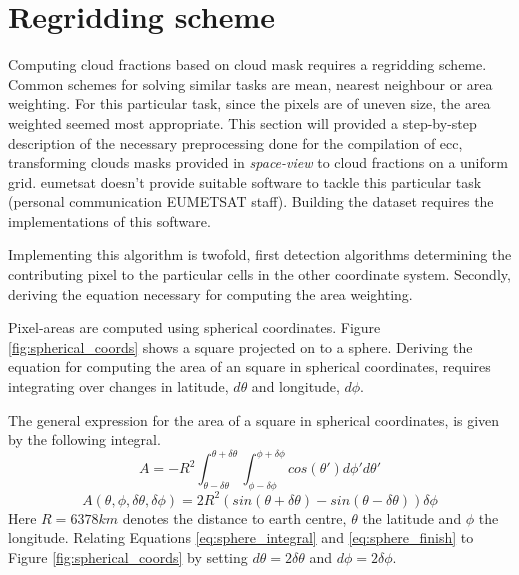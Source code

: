 \section{Regridding scheme} \label{sec:remapping}

Computing cloud fractions based on cloud mask requires a regridding scheme. Common schemes for solving similar tasks are mean, nearest neighbour or area weighting. For this particular task, since the pixels are of uneven size, the area weighted seemed most appropriate. This section will provided a step-by-step description of the necessary preprocessing done for the compilation of \acrshort{ecc}, transforming clouds masks provided in \textit{space-view} to cloud fractions on a uniform grid. \acrshort{eumetsat} doesn't provide suitable software to tackle this particular task (personal communication EUMETSAT staff). Building the dataset requires the implementations of this software.

Implementing this algorithm is twofold, first detection algorithms determining the contributing pixel to the particular cells in the other coordinate system. Secondly,  deriving the equation necessary for computing the area weighting. 

Pixel-areas are computed using spherical coordinates. Figure \ref{fig:spherical_coords} shows a square projected on to a sphere. Deriving the equation for computing the area of an square in spherical coordinates, requires integrating over changes in latitude, $d\theta$ and longitude, $d\phi$. 

The general expression for the area of a square in spherical coordinates, is given by the following integral. 
\begin{equation} \label{eq:sphere_integral}
    A = -R^2\int_{ \theta - \delta \theta }^{\theta + \delta \theta} \int_{ \phi - \delta \phi }^{\phi + \delta \phi} cos\left( \theta' \right) d\phi' d\theta'
\end{equation}
\begin{equation} \label{eq:sphere_finish}
    A \left( \theta, \phi, \delta \theta, \delta \phi   \right)= 2R^2 \left( sin\left( \theta + \delta \theta  \right) - sin\left(  \theta - \delta \theta  \right) \right) \delta \phi
\end{equation}
Here $R=6378km$ denotes the distance to earth centre, $\theta$ the latitude and $\phi$ the longitude. Relating Equations \eqref{eq:sphere_integral} and \eqref{eq:sphere_finish} to Figure \ref{fig:spherical_coords} by setting $d \theta = 2 \delta \theta$ and $d \phi = 2 \delta \phi$.

